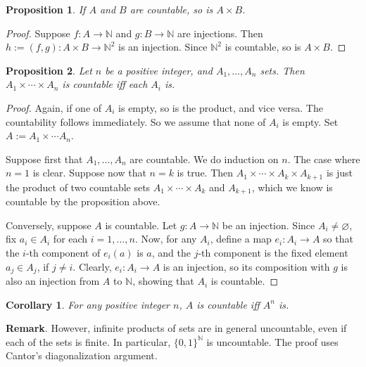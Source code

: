 \documentclass[12pt]{article}
\newtheorem{prop}{Proposition}
\newtheorem{cor}{Corollary}
\begin{document}
\begin{prop} If $A$ and $B$ are countable, so is $A\times B$. \end{prop}
\begin{proof}  Suppose $f:A\to \mathbb{N}$ and $g:B\to \mathbb{N}$ are injections.  Then $h:=(f,g):A\times B\to \mathbb{N}^2$ is an injection.  Since $\mathbb{N}^2$ is countable, so is $A\times B$.
\end{proof}

\begin{prop}  Let $n$ be a positive integer, and $A_1,\ldots, A_n$ sets.  Then $A_1 \times \cdots \times A_n$ is countable iff each $A_i$ is. \end{prop}
\begin{proof}
Again, if one of $A_i$ is empty, so is the product, and vice versa.  The countability follows immediately.  So we assume that none of $A_i$ is empty.  Set $A:=A_1\times \cdots A_n$.

Suppose first that $A_1,\ldots, A_n$ are countable.  We do induction on $n$.  The case where $n=1$ is clear.  Suppose now that $n=k$ is true.  Then $A_1\times \cdots \times A_k \times A_{k+1}$ is just the product of two countable sets $A_1 \times \cdots \times A_k$ and $A_{k+1}$, which we know is countable by the proposition above.

Conversely, suppose $A$ is countable.  Let $g: A \to \mathbb{N}$ be an injection.  Since $A_i \ne \varnothing$, fix $a_i\in A_i$ for each $i = 1,\ldots, n$.  Now, for any $A_i$, define a map $e_i: A_i\to A$ so that the $i$-th component of $e_i(a)$ is $a$, and the $j$-th component is the fixed element $a_j \in A_j$, if $j\ne i$.  Clearly, $e_i: A_i\to A$ is an injection, so its composition with $g$ is also an injection from $A$ to $\mathbb{N}$, showing that $A_i$ is countable.
\end{proof}

\begin{cor} For any positive integer $n$, $A$ is countable iff $A^n$ is. \end{cor}

\textbf{Remark}.  However, infinite products of sets are in general uncountable, even if each of the sets is finite.  In particular, $\lbrace 0,1\rbrace^{\mathbb{N}}$ is uncountable.  The proof uses Cantor's diagonalization argument.

\end{document}
